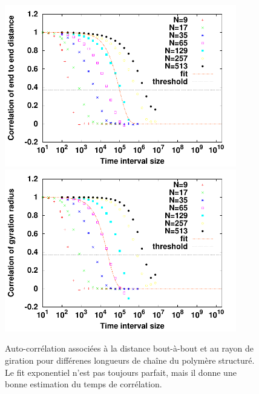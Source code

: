 \documentclass[a4paper,11pt]{article}
\begin{document}
\begin{figure}[H]
\begin{center}
\includegraphics[width=0.9\textwidth]{correlendtoend.pdf}
\includegraphics[width=0.9\textwidth]{correlgyr.pdf}

\caption{Auto-corrélation associées à la distance bout-à-bout et au rayon de giration pour différenes longueurs de chaîne du polymère structuré. Le fit exponentiel n'est pas toujours parfait, mais il donne une bonne estimation du temps de corrélation.}
\label{correl}
\end{center}
\end{figure}
\end{document}
